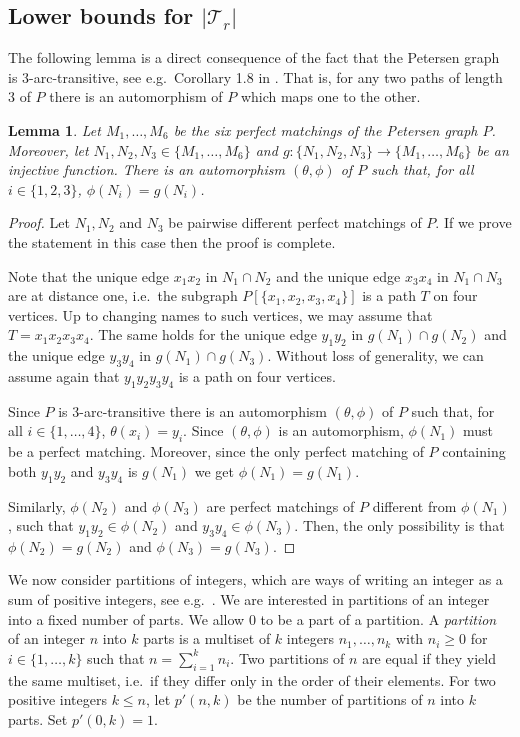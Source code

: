 \documentclass[a4paper,11pt]{article}
\newcommand{\ca}{\mathcal}
\newtheorem{lem}[defi]{Lemma}
\theoremstyle{remark}
\begin{document}
\subsection{Lower bounds for $|\ca T_r|$}

The following lemma is a direct consequence of the fact that the Petersen graph is 
3-arc-transitive, see e.g.~Corollary 1.8 in \cite{Babai_Handbook}.
That is, for any two paths of length 3 of $P$ there is an
automorphism of $P$ which maps one to the other. 


\begin{lem}\label{lem:autP_fixing_3_pm}
	Let $M_1,\dots,M_6$ be the six perfect matchings of the Petersen graph $P$. Moreover, let $N_1,N_2,N_3 \in \{M_1,\dots,M_6\}$ and $g\colon \{N_1,N_2,N_3\} \to \{M_1,\dots,M_6\}$ be an injective function. There is an automorphism $ (\theta,\phi) $ of $P$ such that, for all $i\in\{1,2,3\}$, $\phi(N_i)=g(N_i)$.
\end{lem}

\begin{proof}
	Let $N_1,N_2$ and $N_3$ be pairwise different perfect matchings of $P$. If we prove the statement in this case then the proof is complete.
	
	Note that the unique edge $x_1x_2$ in $N_1\cap N_2$ and the unique edge $x_3x_4$ in $N_1 \cap N_3$ are at distance one, i.e.\ the subgraph $P[\{x_1,x_2,x_3,x_4\}]$ is a path $T$ on four vertices. Up to changing names to such vertices, we may assume that $T=x_1x_2x_3x_4$. The same holds for the unique edge $y_1y_2$ in $g(N_1)\cap g(N_2)$ and the unique edge $y_3y_4$ in $g(N_1) \cap g(N_3)$. Without loss of generality, we can assume again that $y_1y_2y_3y_4$ is a path on four vertices.
	
	Since $P$ is 3-arc-transitive there is an automorphism $ (\theta,\phi) $ of $P$ such that, for all $i\in\{1,\dots,4\} $, $ \theta(x_i)=y_i$. Since $ (\theta,\phi) $ is an automorphism, $\phi(N_1)$ must be a perfect matching. Moreover, since the only perfect matching of $P$ containing both $y_1y_2$ and $y_3y_4$ is $g(N_1)$ we get $\phi(N_1)=g(N_1)$.
	
	Similarly, $\phi(N_2)$ and $\phi(N_3)$ are perfect matchings of $P$ different from $\phi(N_1)$, such that $y_1y_2\in \phi(N_2)$ and $y_3y_4 \in \phi(N_3)$. Then, the only possibility is that $\phi(N_2)=g(N_2)$ and $\phi(N_3)=g(N_3).$
\end{proof}


We now consider partitions of integers, which are ways of writing an integer as a sum of positive integers, see e.g.~\cite{matouvsek2008invitation}. 
We are interested in partitions of an integer into a fixed number of parts.
We allow $0$ to be a part of a partition.
A \emph{partition} of an integer $n$ into $k$ parts is a multiset of $k$ integers
$n_1, \dots,n_k$ with $n_i \geq 0$ for $i \in \{1, \dots,k\}$ 
such that $n = \sum_{i=1}^k n_i$. Two partitions of $n$ are equal if
they yield the same multiset, i.e.\ if they differ only in the order of their elements. 
For two positive integers $k\le n$, let $p'(n,k)$ be the number of partitions of $n$ into $k$ parts. Set $p'(0,k)=1$.   
\end{document}
